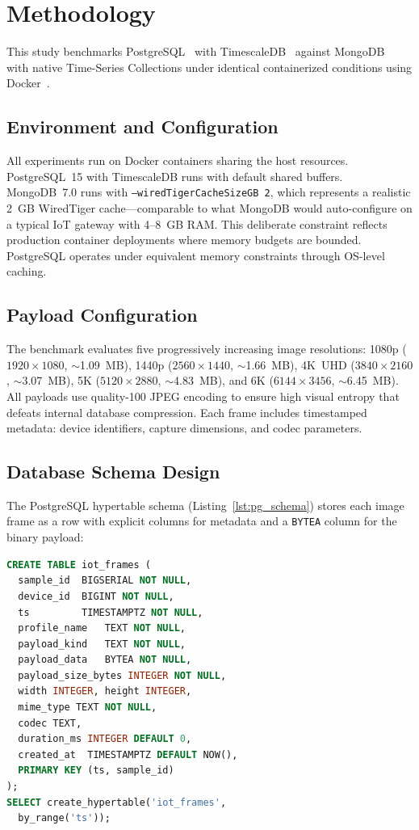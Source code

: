 \documentclass[conference]{IEEEtran}
\begin{document}
\section{Methodology}
\label{sec:methodology}

This study benchmarks PostgreSQL~\cite{postgresql_official} with TimescaleDB~\cite{timescaledb_official} against MongoDB~\cite{mongodb_official} with native Time-Series Collections under identical containerized conditions using Docker~\cite{docker_official}.

\subsection{Environment and Configuration}
All experiments run on Docker containers sharing the host resources. PostgreSQL~15 with TimescaleDB runs with default shared buffers. MongoDB~7.0 runs with \texttt{--wiredTigerCacheSizeGB~2}, which represents a realistic 2~GB WiredTiger cache---comparable to what MongoDB would auto-configure on a typical IoT gateway with 4--8~GB RAM. This deliberate constraint reflects production container deployments where memory budgets are bounded. PostgreSQL operates under equivalent memory constraints through OS-level caching.

\subsection{Payload Configuration}
The benchmark evaluates five progressively increasing image resolutions: 1080p ($1920{\times}1080$, $\sim$1.09~MB), 1440p ($2560{\times}1440$, $\sim$1.66~MB), 4K~UHD ($3840{\times}2160$, $\sim$3.07~MB), 5K ($5120{\times}2880$, $\sim$4.83~MB), and 6K ($6144{\times}3456$, $\sim$6.45~MB). All payloads use quality-100 JPEG encoding to ensure high visual entropy that defeats internal database compression. Each frame includes timestamped metadata: device identifiers, capture dimensions, and codec parameters.

\subsection{Database Schema Design}
The PostgreSQL hypertable schema (Listing~\ref{lst:pg_schema}) stores each image frame as a row with explicit columns for metadata and a \texttt{BYTEA} column for the binary payload:

\begin{lstlisting}[language=SQL,basicstyle=\ttfamily\scriptsize,breaklines=true,caption={PostgreSQL (TimescaleDB) table schema.},label={lst:pg_schema}]
CREATE TABLE iot_frames (
  sample_id  BIGSERIAL NOT NULL,
  device_id  BIGINT NOT NULL,
  ts         TIMESTAMPTZ NOT NULL,
  profile_name   TEXT NOT NULL,
  payload_kind   TEXT NOT NULL,
  payload_data   BYTEA NOT NULL,
  payload_size_bytes INTEGER NOT NULL,
  width INTEGER, height INTEGER,
  mime_type TEXT NOT NULL,
  codec TEXT,
  duration_ms INTEGER DEFAULT 0,
  created_at  TIMESTAMPTZ DEFAULT NOW(),
  PRIMARY KEY (ts, sample_id)
);
SELECT create_hypertable('iot_frames',
  by_range('ts'));
\end{lstlisting}
\end{document}
